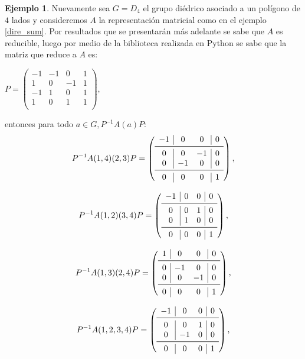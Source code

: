 \documentclass[12pt]{book}
\theoremstyle{definition}
\newtheorem{example}[theorem]{Ejemplo}
\newcounter{in}
\begin{document}
\begin{example}
Nuevamente sea $G = D_{4}$ el grupo diédrico asociado a un polígono de
$4$ lados y consideremos $A$ la representación matricial como en el ejemplo \ref{dire_sum}. Por resultados que se presentarán
más adelante se sabe que $A$ es reducible, luego por medio de la
biblioteca realizada en Python se sabe que la matriz que reduce a $A$
es:
\begin{center} 
$P = \begin{pmatrix}
-1 &  -1 &  0 &  1 \\ 
1 &  0 &  -1 &  1 \\  
-1 &  1 &  0 &  1 \\ 
1 &  0 &  1 &  1 \\
\end{pmatrix},$
\end{center}
entonces para todo $a \in G, P^{-1}A(a)P:$
\[
P^{-1}A(1, 4)(2, 3)P =
\left( \begin{array}{c|cc|c}
-1 &  0 &  0 & 0 \\
\midrule
 0 &  0 & -1 & 0 \\
 0 & -1 &  0 & 0 \\
\midrule
 0 &  0 &  0 & 1 \\
\end{array}\right), 
\]

\[
P^{-1}A(1, 2)(3, 4)P =
\left( \begin{array}{c|cc|c}
-1 & 0 & 0 & 0 \\
\midrule
 0 & 0 & 1 & 0 \\
 0 & 1 & 0 & 0 \\ 
\midrule
 0 & 0 & 0 & 1 \\ 
\end{array}\right),
\]

\[
P^{-1}A(1, 3)(2, 4)P =
\left( \begin{array}{c|cc|c}
1 &  0 &  0 & 0 \\
\midrule
0 & -1 &  0 & 0 \\
0 &  0 & -1 & 0 \\
\midrule
0 &  0 &  0 & 1 \\
\end{array}\right),
\]

\[
P^{-1}A(1, 2, 3, 4)P =
\left( \begin{array}{c|cc|c}
-1 &  0 & 0 & 0 \\
\midrule
 0 &  0 & 1 & 0 \\
 0 & -1 & 0 & 0 \\
\midrule
 0 &  0 & 0 & 1 \\
\end{array}\right),
\]


\end{example}
\end{document}
